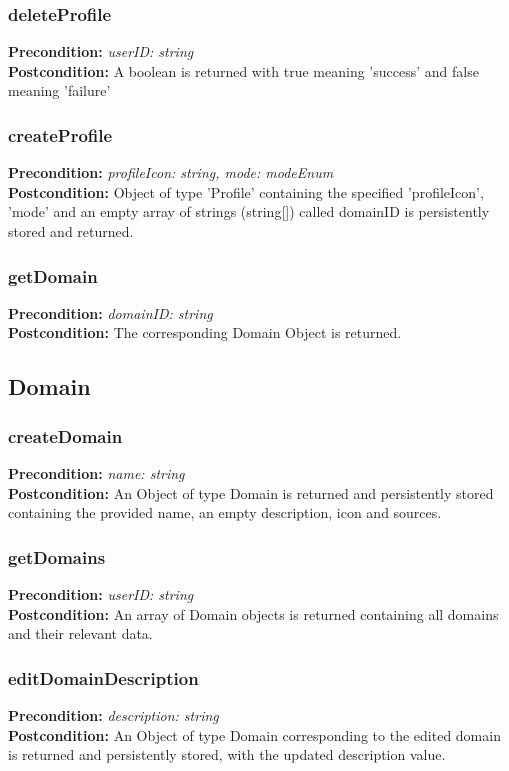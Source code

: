 \documentclass[12pt]{article}
\begin{document}
\subsubsection*{deleteProfile}
\textbf{Precondition:} \textit{userID: string} \\
\textbf{Postcondition:} A boolean is returned with true meaning 'success' and false meaning 'failure'

\subsubsection*{createProfile}
\textbf{Precondition:} \textit{profileIcon: string, mode: modeEnum} \\
\textbf{Postcondition:} Object of type 'Profile' containing the specified 'profileIcon', 'mode' and an empty array of strings (string[]) called domainID is persistently stored and returned.

\subsubsection*{getDomain}
\textbf{Precondition:} \textit{domainID: string} \\
\textbf{Postcondition:} The corresponding Domain Object is returned.

\subsection{Domain}

\subsubsection*{createDomain}
\textbf{Precondition:} \textit{name: string} \\
\textbf{Postcondition:} An Object of type Domain is returned and persistently stored containing the provided name, an empty description, icon and sources.

\subsubsection*{getDomains}
\textbf{Precondition:} \textit{userID: string} \\
\textbf{Postcondition:} An array of Domain objects is returned containing all domains and their relevant data.

\subsubsection*{editDomainDescription}
\textbf{Precondition:} \textit{description: string} \\
\textbf{Postcondition:} An Object of type Domain corresponding to the edited domain is returned and persistently stored, with the updated description value.
\end{document}
